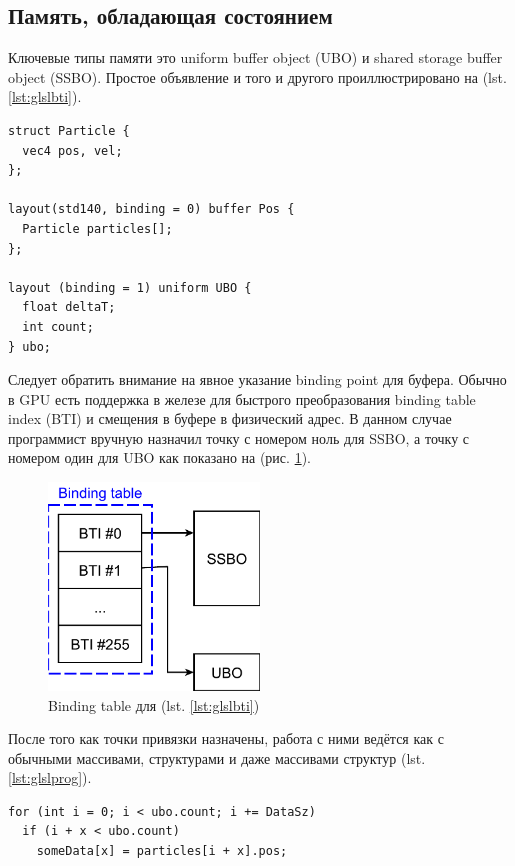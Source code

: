 \documentclass[a4paper,12pt,oneside]{article}
\begin{document}
\subsection{Память, обладающая состоянием}\label{subsec:stateful}

Ключевые типы памяти это uniform buffer object (UBO) и shared storage buffer object (SSBO). Простое объявление и того и другого проиллюстрировано на (lst. \ref{lst:glslbti}).

\begin{lstlisting}[caption={Простая программа на GLSL с явными binding индексами},label={lst:glslbti}]
struct Particle {
  vec4 pos, vel;
};

layout(std140, binding = 0) buffer Pos {
  Particle particles[];
};

layout (binding = 1) uniform UBO {
  float deltaT; 
  int count;
} ubo;
\end{lstlisting}

Следует обратить внимание на явное указание binding point для буфера. Обычно в GPU есть поддержка в железе для быстрого преобразования binding table index (BTI) и смещения в буфере в физический адрес. В данном случае программист вручную назначил точку с номером ноль для SSBO, а точку с номером один для UBO как показано на (рис. \ref{fig:bti-idea}).

\begin{figure}
\centering
\includegraphics[width=0.5\textwidth]{pictures/bti-idea.pdf}
\caption{Binding table для (lst. \ref{lst:glslbti})}
\label{fig:bti-idea}
\end{figure}

После того как точки привязки назначены, работа с ними ведётся как с обычными массивами, структурами и даже массивами структур (lst. \ref{lst:glslprog}).

\begin{lstlisting}[caption={Работа с UBO и SSBO на GLSL},label={lst:glslprog}]
for (int i = 0; i < ubo.count; i += DataSz)
  if (i + x < ubo.count)
    someData[x] = particles[i + x].pos;
\end{lstlisting}
\end{document}
